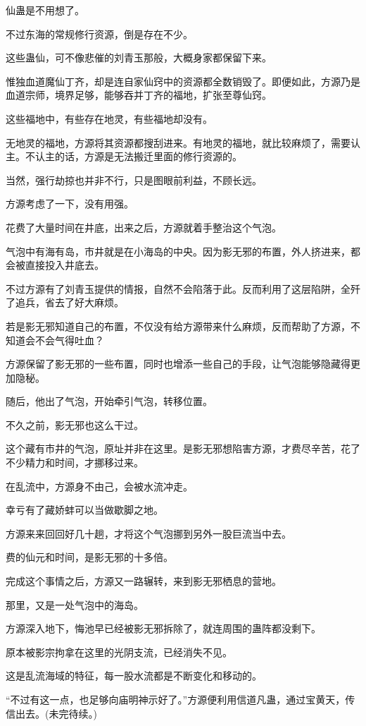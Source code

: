 \begin{this_body}
仙蛊是不用想了。

不过东海的常规修行资源，倒是存在不少。

这些蛊仙，可不像悲催的刘青玉那般，大概身家都保留下来。

惟独血道魔仙丁齐，却是连自家仙窍中的资源都全数销毁了。即便如此，方源乃是血道宗师，境界足够，能够吞并丁齐的福地，扩张至尊仙窍。

这些福地中，有些存在地灵，有些福地却没有。

无地灵的福地，方源将其资源都搜刮进来。有地灵的福地，就比较麻烦了，需要认主。不认主的话，方源是无法搬迁里面的修行资源的。

当然，强行劫掠也并非不行，只是图眼前利益，不顾长远。

方源考虑了一下，没有用强。

花费了大量时间在井底，出来之后，方源就着手整治这个气泡。

气泡中有海有岛，市井就是在小海岛的中央。因为影无邪的布置，外人挤进来，都会被直接投入井底去。

不过方源有了刘青玉提供的情报，自然不会陷落于此。反而利用了这层陷阱，全歼了追兵，省去了好大麻烦。

若是影无邪知道自己的布置，不仅没有给方源带来什么麻烦，反而帮助了方源，不知道会不会气得吐血？

方源保留了影无邪的一些布置，同时也增添一些自己的手段，让气泡能够隐藏得更加隐秘。

随后，他出了气泡，开始牵引气泡，转移位置。

不久之前，影无邪也这么干过。

这个藏有市井的气泡，原址并非在这里。是影无邪想陷害方源，才费尽辛苦，花了不少精力和时间，才挪移过来。

在乱流中，方源身不由己，会被水流冲走。

幸亏有了藏娇蚌可以当做歇脚之地。

方源来来回回好几十趟，才将这个气泡挪到另外一股巨流当中去。

费的仙元和时间，是影无邪的十多倍。

完成这个事情之后，方源又一路辗转，来到影无邪栖息的营地。

那里，又是一处气泡中的海岛。

方源深入地下，悔池早已经被影无邪拆除了，就连周围的蛊阵都没剩下。

原本被影宗拘拿在这里的光阴支流，已经消失不见。

这是乱流海域的特征，每一股水流都是不断变化和移动的。

“不过有这一点，也足够向庙明神示好了。”方源便利用信道凡蛊，通过宝黄天，传信出去。(未完待续。)

\end{this_body}


